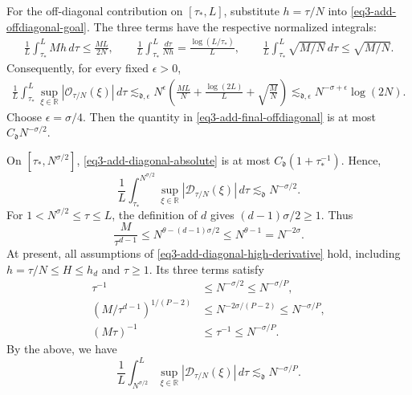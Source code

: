 \documentclass[reqno,12pt]{amsart}
\def \R {\mathbb R}
\numberwithin{equation}{section}
\begin{document}
For the off-diagonal contribution on $[\tau_*,L]$, substitute
$h=\tau/N$ into \eqref{eq3-add-offdiagonal-goal}. The three terms
have the respective normalized integrals:
\[
 \begin{split}
 \frac1L\int_{\tau_*}^L Mh\,d\tau
   \le\frac{ML}{2N},\qquad
 \frac1L\int_{\tau_*}^L\frac{d\tau}{Nh}
   =\frac{\log(L/\tau_*)}{L},\qquad
 \frac1L\int_{\tau_*}^L\sqrt{M/N}\,d\tau\le\sqrt{M/N}.
 \end{split}
\]
Consequently, for every fixed $\epsilon>0$,
\begin{equation}
 \begin{split}
 \frac1L\int_{\tau_*}^L\sup_{\xi\in\R}
                  |\mathcal O_{\tau/N}(\xi)|\,d\tau
 \lesssim_{\mathfrak d,\epsilon}N^\epsilon
       \left(\frac{ML}{N}+\frac{\log(2L)}L+\sqrt{\frac MN}\right)
 \lesssim_{\mathfrak d,\epsilon}
                          N^{-\sigma+\epsilon}\log(2N).
 \end{split}
 \label{eq3-add-final-offdiagonal}
\end{equation}
Choose $\epsilon=\sigma/4$.
Then the quantity in \eqref{eq3-add-final-offdiagonal} is at most
$C_{\mathfrak d}N^{-\sigma/2}$.

On $[\tau_*,N^{\sigma/2}]$,
\eqref{eq3-add-diagonal-absolute} is at most
$C_{\mathfrak d}(1+\tau_*^{-1})$. Hence,
\begin{equation}
 \frac1L\int_{\tau_*}^{N^{\sigma/2}}\sup_{\xi\in\R}
               |\mathcal D_{\tau/N}(\xi)|\,d\tau
 \lesssim_{\mathfrak d}N^{-\sigma/2}.
 \label{eq3-add-final-moderate}
\end{equation}
For $1<N^{\sigma/2}\le\tau\le L$, the definition of $d$ gives
$(d-1)\sigma/2\ge1$. Thus
\[
 \frac M{\tau^{d-1}}
 \le N^{\theta-(d-1)\sigma/2}\le N^{\theta-1}=N^{-2\sigma}.
\]
At present, all assumptions of \eqref{eq3-add-diagonal-high-derivative} hold,
including $h=\tau/N\le H\le h_d$ and $\tau\ge1$.
Its three terms satisfy
\begin{align*}
 \tau^{-1}&\le N^{-\sigma/2}\le N^{-\sigma/P},\\
 (M/\tau^{d-1})^{1/(P-2)}
   &\le N^{-2\sigma/(P-2)}\le N^{-\sigma/P},\\
 (M\tau)^{-1}&\le\tau^{-1}\le N^{-\sigma/P}.
\end{align*}
By the above, we have 
\begin{equation}
 \frac1L\int_{N^{\sigma/2}}^L\sup_{\xi\in\R}
                 |\mathcal D_{\tau/N}(\xi)|\,d\tau
 \lesssim_{\mathfrak d}N^{-\sigma/P}.
 \label{eq3-add-final-large}
\end{equation}
\end{document}
